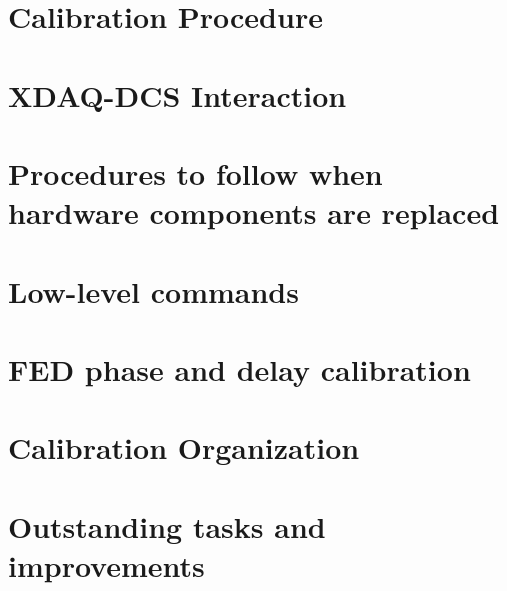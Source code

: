 \documentclass[12pt]{article}
\begin{document}
\section{Calibration Procedure}
\label{sec:calibproc}


\section{XDAQ-DCS Interaction}
\label{sec:dcs}


\section{Procedures to follow when hardware components are replaced}
\label{sec:hardware}


\section{Low-level commands}
\label{sec:lowlevel}


\clearpage

\appendix
\section{FED phase and delay calibration}
\label{App:phaseanddelay}



\section{Calibration Organization}
\label{App:caliborganize}


\section{Outstanding tasks and improvements}
\label{App:outstanding}


\clearpage



\end{document}
